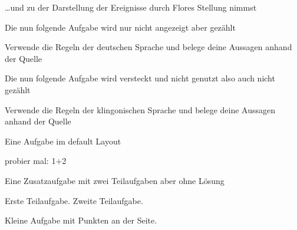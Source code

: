 \documentclass[a4paper,12pt]{scrartcl}
\begin{document}
    \begin{aufgabe}[points=30, subtitle=Beurteilung,symbol=\symBleistift]
        \dots und zu der Darstellung der Ereignisse durch Flores Stellung nimmst
    \end{aufgabe}

    Die nun folgende Aufgabe wird nur nicht angezeigt aber gezählt
    \begin{aufgabe}[points=20,print=false]
        Verwende die Regeln der deutschen Sprache und belege deine Aussagen anhand der Quelle
    \end{aufgabe}

    Die nun folgende Aufgabe wird versteckt und nicht genutzt also auch nicht gezählt
    \begin{aufgabe}[points=20,use=false,print=false]
        Verwende die Regeln der klingonischen Sprache und belege deine Aussagen anhand der Quelle
    \end{aufgabe}



    \begin{aufgabe*}[symbol=\symSprechblase]
        Eine Aufgabe im default Layout
        \begin{bearbeitungshinweis}
            probier mal: 1+2
        \end{bearbeitungshinweis}
    \end{aufgabe*}

    \begin{aufgabe}[subtitle={Superschwere Aufgabe},points=5, bonus-points=10,symbol=\symHaken]
        Eine Zusatzaufgabe mit zwei Teilaufgaben aber ohne Lösung
        \begin{teilaufgaben}
            \teilaufgabe Erste Teilaufgabe.
            \teilaufgabe Zweite Teilaufgabe.
        \end{teilaufgaben}
    \end{aufgabe}


    \begin{aufgabe}[points=4]
        Kleine Aufgabe mit Punkten an der Seite.
    \end{aufgabe}


\end{document}
